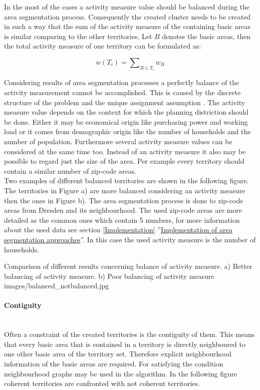 In the most of the cases a activity measure value should be balanced during the area segmentation process. Consequently the created cluster needs to be created in such a way that the sum of the activity measure of the containing basic areas is similar comparing to the other territories. Let $ B $ denotes the basic areas, then the total activity measure of one territory can be formulated as:

\[ \mathit{w(T_{i}) = \sum\nolimits  _{B \in T_{i}} w_{B}}\]

Considering results of area segmentation processes a perfectly balance of the activity measurement cannot be accomplished. This is caused by the discrete structure of the problem and the unique assignment assumption \cite{kalcsics}. The activity measure value depends on the context for which the planning distriction should be done. Either it may be economical origin like purchasing power and working load or it comes from demographic origin like the number of households and the number of population. Furthermore several activity measure values can be considered at the same time too. Instead of an activity measure it also may be possible to regard just the size of the area. Per example every territory should contain a similar number of zip-code areas.\\
Two examples of different balanced territories are shown in the following figure. The territories in Figure a) are more balanced considering an activity measure then the ones in Figure b). The area segmentation process is done to zip-code areas from Dresden and its neighbourhood. The used zip-code areas are more detailed as the common ones which contain 5 numbers, for more information about the used data see section \ref{Implementation} ''\hyperref[Implementation]{Implementation of area segmentation approaches}''. In this case the used activity measure is the number of households.

\begin{figureOwn}{Comparison of different results concerning balance of activity measure. a) Better balancing of activity measure. b) Poor balancing of activity measure }{images/balanced_notbalanced.jpg}\end{figureOwn}


\paragraph{Contiguity}\mbox{} \\

Often a constraint of the created territories is the contiguity of them. This means that every basic area that is contained in a territory is directly neighboured to one other basic area of the territory set. Therefore explicit neighbourhood information of the basic areas are required. For satisfying the condition neighbourhood graphs may be used in the algorithm. In the following figure coherent territories are confronted with not coherent territories.

